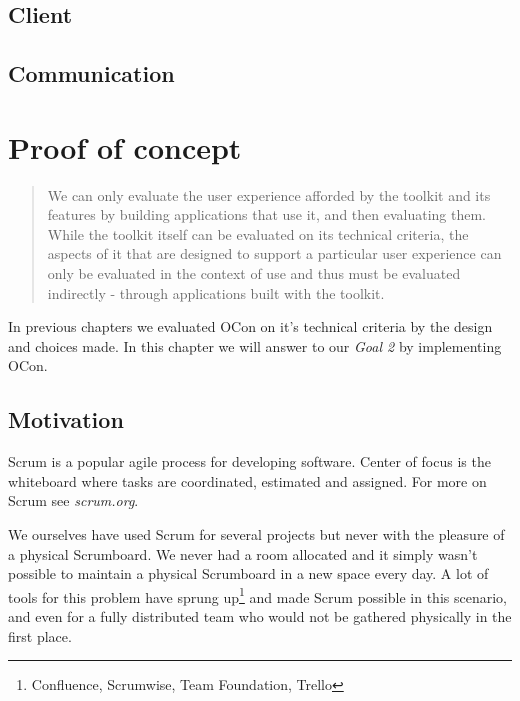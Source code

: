 \documentclass[]{report}
\begin{document}
\section{Client}

\section{Communication}



\chapter{Proof of concept}

\blockquote{
We can only evaluate the user experience afforded by the toolkit and its features by building applications that use it, and then evaluating them. While the toolkit itself can be evaluated on its technical criteria, the aspects of it that are designed to support a particular user experience can only be evaluated in the context of use and thus must be evaluated indirectly - through applications built with the toolkit. \cite{Infrastructure (2003)} \\}

In previous chapters we evaluated OCon on it's technical criteria by the design and choices made. In this chapter we will answer to our \textit{Goal 2} by implementing OCon.

\section{Motivation}




Scrum is a popular agile process for developing software. Center of focus is the whiteboard where tasks are coordinated, estimated and assigned. For more on Scrum see \textit{scrum.org}.

We ourselves have used Scrum for several projects but never with the pleasure of a physical Scrumboard. We never had a room allocated and it simply wasn't possible to maintain a physical Scrumboard in a new space every day. A lot of tools for this problem have sprung up\footnote{Confluence, Scrumwise, Team Foundation, Trello} and made Scrum possible in this scenario, and even for a fully distributed team who would not be gathered physically in the first place.
\end{document}
